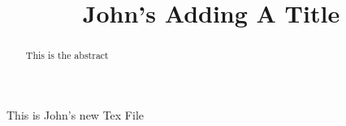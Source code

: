 \documentclass{ximera}
\title{John's Adding A Title}
\begin{document}
\begin{abstract}
This is the abstract
\end{abstract}
\maketitle
This is John's new Tex File
\end{document}
